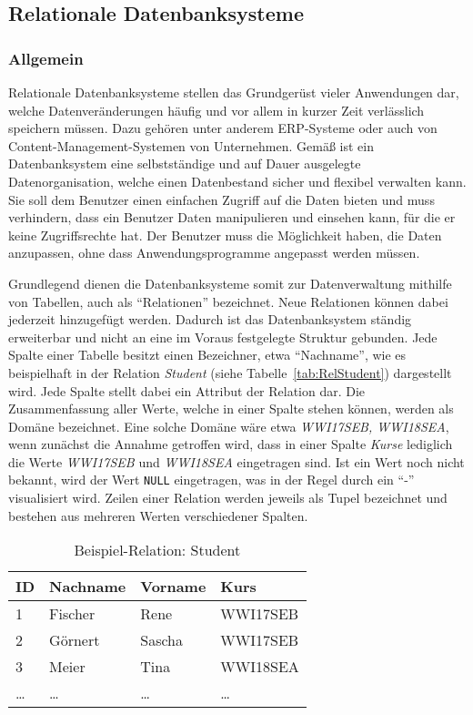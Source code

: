 \subsection{Relationale Datenbanksysteme}
\label{sec:grundlagen:reldb}
\subsubsection{Allgemein}

Relationale Datenbanksysteme stellen das Grundgerüst vieler Anwendungen dar, welche Datenveränderungen häufig und vor allem in kurzer Zeit verlässlich speichern müssen.
Dazu gehören unter anderem \ac{ERP}-Systeme oder auch von Content-Management-Systemen von Unternehmen.
Gemäß \citeauthor{Book_DB_2} ist ein Datenbanksystem eine selbstständige und auf Dauer ausgelegte Datenorganisation, welche einen Datenbestand sicher und flexibel verwalten kann.
Sie soll dem Benutzer einen einfachen Zugriff auf die Daten bieten und muss verhindern, dass ein Benutzer Daten manipulieren und einsehen kann, für die er keine Zugriffsrechte hat.
Der Benutzer muss die Möglichkeit haben, die Daten anzupassen, ohne dass Anwendungsprogramme angepasst werden müssen.\autocite[Vgl.][S. 5 f.]{Book_DB_2}

Grundlegend dienen die Datenbanksysteme somit zur Datenverwaltung mithilfe von Tabellen, auch als \enquote{Relationen} bezeichnet.
Neue Relationen können dabei jederzeit hinzugefügt werden. 
Dadurch ist das Datenbanksystem ständig erweiterbar und nicht an eine im Voraus festgelegte Struktur gebunden.
Jede Spalte einer Tabelle besitzt einen Bezeichner, etwa \enquote{Nachname}, wie es beispielhaft in der Relation \emph{Student} (siehe Tabelle~\vref{tab:RelStudent}) dargestellt wird.
Jede Spalte stellt dabei ein Attribut der Relation dar.
Die Zusammenfassung aller Werte, welche in einer Spalte stehen können, werden als Domäne bezeichnet.
Eine solche Domäne wäre etwa \emph{WWI17SEB, WWI18SEA}, wenn zunächst die Annahme getroffen wird, dass in einer Spalte \emph{Kurse} lediglich die Werte \emph{WWI17SEB} und \emph{WWI18SEA} eingetragen sind.
Ist ein Wert noch nicht bekannt, wird der Wert \texttt{NULL} eingetragen, was in der Regel durch ein \enquote{-} visualisiert wird.
Zeilen einer Relation werden jeweils als Tupel bezeichnet und bestehen aus mehreren Werten verschiedener Spalten.\autocite[Vgl.][S. 9 ff.]{Book_DB_2}

\begin{table}
    \centering
    \begin{tabular}[h]{l | l | l | l}
        ID & Nachname & Vorname & Kurs \\ \hline
        1 & Fischer & Rene & WWI17SEB \\
        2 & Görnert & Sascha & WWI17SEB \\
        3 & Meier & Tina & WWI18SEA \\
        \dots & \dots & \dots & \dots \\
        \end{tabular}
        \caption{Beispiel-Relation: Student}
        \label{tab:RelStudent}
\end{table}


